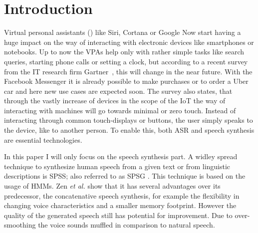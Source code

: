 



\section{Introduction}

Virtual personal assistants () like Siri, Cortana or Google Now start having a huge impact on the way of interacting with electronic devices like smartphones or notebooks. Up to now the \acp{VPA} help only with rather simple tasks like search queries, starting phone calls or setting a clock, but according to a recent survey from the IT research firm Gartner~\cite{gartner:assistants}, this will change in the near future. With the Facebook Messenger it is already possible to make purchases or to order a Uber car and here new use cases are expected soon. The survey also states, that through the vastly increase of devices in the scope of the \ac{IoT} the way of interacting with machines will go towards minimal or zero touch. Instead of interacting through common touch-displays or buttons, the user simply speaks to the device, like to another person. To enable this, both \ac{ASR} and speech synthesis are essential technologies.

In this paper I will only focus on the speech synthesis part. A widley spread technique to synthesize human speech from a given text or from linguistic descriptions is \ac{SPSS}; also referred to as \ac{SPSG} \cite{ling:deep}. This technique is based on the usage of \acp{HMM}. Zen \textsl{et al.} \cite{zen:statistical} show that it has several advantages over its predecessor, the concatenative speech synthesis, for example the flexibility in changing voice characteristics and a smaller memory footprint. However the quality of the generated speech still has potential for improvement. Due to over-smoothing the voice sounds muffled in comparison to natural speech.

